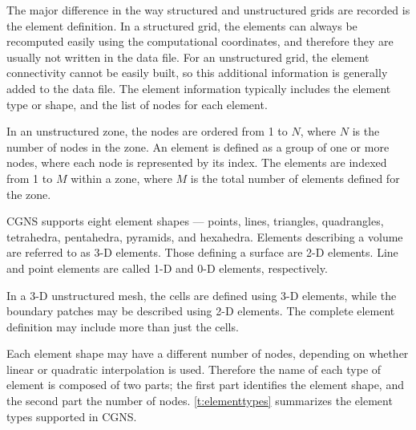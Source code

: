 {{{The major difference in the way structured and unstructured grids are
recorded is the element definition.
In a structured grid, the elements can always be recomputed easily
using the computational coordinates, and therefore they are usually
not written in the data file.
For an unstructured grid, the element connectivity cannot be easily
built, so this additional information is generally added to the data file.
The element information typically includes the element type or shape,
and the list of nodes for each element.

In an unstructured zone, the nodes are ordered from 1 to $N$, where $N$
is the number of nodes in the zone.
An element is defined as a group of one or more nodes, where each node
is represented by its index.
The elements are indexed from 1 to $M$ within a zone, where $M$
is the total number of elements defined for the zone.

CGNS supports eight element shapes --- points, lines, triangles,
quadrangles, tetrahedra, pentahedra, pyramids, and hexahedra.
Elements describing a volume are referred to as 3-D elements.
Those defining a surface are 2-D elements.
Line and point elements are called 1-D and 0-D elements, respectively.

In a 3-D unstructured mesh, the cells are defined using 3-D elements,
while the boundary patches may be described using 2-D elements.
The complete element definition may include more than just the cells.

Each element shape may have a different number of nodes, depending on
whether linear or quadratic interpolation is used.
Therefore the name of each type of element is composed of two parts;
the first part identifies the element shape, and the second part the
number of nodes.
\autoref{t:elementtypes} summarizes the element types supported in CGNS.

}}}
